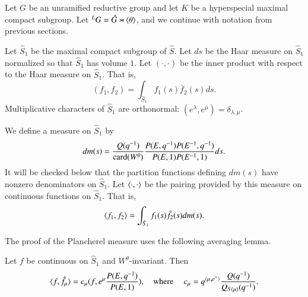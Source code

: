 Let $G$ be an unramified reductive group and let $K$ be a hyperspecial maximal compact subgroup.
Let ${}^LG = \hat G\rtimes \langle{\theta}\rangle$, and we continue with notation from previous sections.

Let $\hat S_1$ be the maximal compact subgroup of $\hat S$.  Let $ds$ be the Haar measure on $\hat S_1$ normalized
so that $\hat S_1$ has volume $1$.
Let $(\cdot,\cdot)$ be the inner product with respect to the Haar  measure on $\hat S_1$. That is,
\[
(f_1,f_2) = \int_{\hat S_1} f_1(s) \bar f_2(s) ds.
\]
Multiplicative characters of $\hat S_1$ are orthonormal: $(e^\lambda,e^\mu) = \delta_{\lambda,\mu}$.  


We define a measure on $\hat S_1$ by
\begin{equation}
dm(s) = \frac{Q(q^{-1})}{{\operatorname{card}}(W^\theta)}\frac{P(E,q^{-1}) P(E^{-1},q^{-1})}{P(E,1) P(E^{-1},1)} ds.
\end{equation}
It will be checked below that
the partition functions defining 
$dm(s)$
have nonzero  denominators on $\hat S_1$.
Let $\langle{\cdot,\cdot}\rangle$ be the pairing provided by this measure on continuous functions on $\hat S_1$.
That is, 
\[
\langle{f_1,f_2}\rangle = \int_{\hat S_1} f_1(s) \bar f_2(s) dm(s).
\]

The proof of the Plancherel measure uses the following averaging lemma.

\begin{lemma}\label{lemma:average} 
Let $f$ be continuous on $\hat S_1$ and $W^\theta$-invariant.
Then
\[
\langle{f,\hat f_\mu}\rangle = c_\mu  (f, e^\mu\frac{ P(E,q^{-1})}{P(E,1)}),
\quad\text{where }\quad
c_\mu = q^{\langle{\mu,\rho^\vee}\rangle}\frac{ Q(q^{-1})}{Q_{S(\mu)}(q^{-1})}.
\]
\end{lemma}

